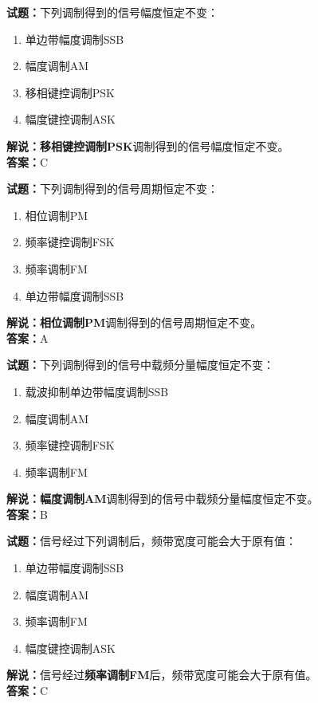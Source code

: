 \documentclass{ctexbook}
\begin{document}
\bigskip


\noindent\textbf{试题：}下列调制得到的信号幅度恒定不变：
\begin{enumerate}[leftmargin=3em]
\item 单边带幅度调制SSB
\item 幅度调制AM
\item 移相键控调制PSK
\item 幅度键控调制ASK
\end{enumerate}
\noindent\textbf{解说：}\textbf{移相键控调制PSK}调制得到的信号幅度恒定不变。\\\noindent\textbf{答案：}C




\bigskip


\noindent\textbf{试题：}下列调制得到的信号周期恒定不变：
\begin{enumerate}[leftmargin=3em]
\item 相位调制PM
\item 频率键控调制FSK
\item 频率调制FM
\item 单边带幅度调制SSB
\end{enumerate}
\noindent\textbf{解说：}\textbf{相位调制PM}调制得到的信号周期恒定不变。\\\noindent\textbf{答案：}A




\bigskip


\noindent\textbf{试题：}下列调制得到的信号中载频分量幅度恒定不变：
\begin{enumerate}[leftmargin=3em]
\item 载波抑制单边带幅度调制SSB
\item 幅度调制AM
\item 频率键控调制FSK
\item 频率调制FM
\end{enumerate}
\noindent\textbf{解说：}\textbf{幅度调制AM}调制得到的信号中载频分量幅度恒定不变。\\\noindent\textbf{答案：}B




\bigskip


\noindent\textbf{试题：}信号经过下列调制后，频带宽度可能会大于原有值：
\begin{enumerate}[leftmargin=3em]
\item 单边带幅度调制SSB
\item 幅度调制AM
\item 频率调制FM
\item 幅度键控调制ASK
\end{enumerate}
\noindent\textbf{解说：}信号经过\textbf{频率调制FM}后，频带宽度可能会大于原有值。\\\noindent\textbf{答案：}C
\end{document}

